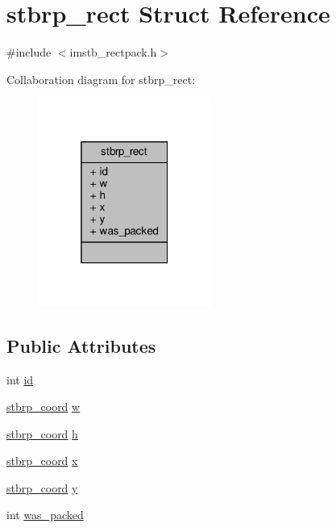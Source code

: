 \hypertarget{structstbrp__rect}{}\section{stbrp\+\_\+rect Struct Reference}
\label{structstbrp__rect}


{\ttfamily \#include $<$imstb\+\_\+rectpack.\+h$>$}



Collaboration diagram for stbrp\+\_\+rect\+:
\nopagebreak
\begin{figure}[H]
\begin{center}
\leavevmode
\includegraphics[width=160pt]{structstbrp__rect__coll__graph}
\end{center}
\end{figure}
\subsection*{Public Attributes}
\begin{DoxyCompactItemize}
\item 
int \hyperlink{structstbrp__rect_a92da8626bc99df041c0c3bfd01c25f7a}{id}
\item 
\hyperlink{imstb__rectpack_8h_a4a396a45893c12de32e2d598abd6b302}{stbrp\+\_\+coord} \hyperlink{structstbrp__rect_a248d43f1eb979c1e7b92ba6df431dec5}{w}
\item 
\hyperlink{imstb__rectpack_8h_a4a396a45893c12de32e2d598abd6b302}{stbrp\+\_\+coord} \hyperlink{structstbrp__rect_af68de2dadc7972b7c089d5e0c0558398}{h}
\item 
\hyperlink{imstb__rectpack_8h_a4a396a45893c12de32e2d598abd6b302}{stbrp\+\_\+coord} \hyperlink{structstbrp__rect_a4cc623a3e29f0bc0d3375f6645c84d18}{x}
\item 
\hyperlink{imstb__rectpack_8h_a4a396a45893c12de32e2d598abd6b302}{stbrp\+\_\+coord} \hyperlink{structstbrp__rect_ae3034c1fbf86043b568f5a4dddf946fa}{y}
\item 
int \hyperlink{structstbrp__rect_a74ba347755ce17f2f8a2ea66c612af49}{was\+\_\+packed}
\end{DoxyCompactItemize}


